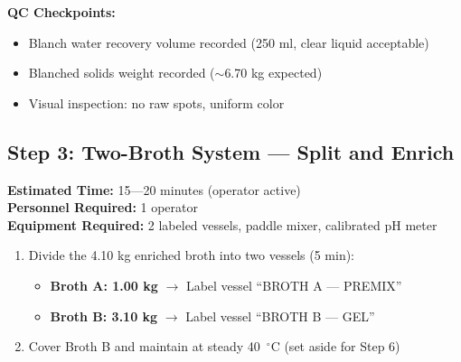 {\textbf{QC Checkpoints:}
\begin{itemize}
\item Blanch water recovery volume recorded (250 ml, clear liquid acceptable)
\item Blanched solids weight recorded ($\sim$6.70 kg expected)
\item Visual inspection: no raw spots, uniform color
\end{itemize}


\subsection*{Step 3: Two-Broth System --- Split and Enrich}
\textbf{Estimated Time:} 15---20 minutes (operator active) \\
\textbf{Personnel Required:} 1 operator \\
\textbf{Equipment Required:} 2 labeled vessels, paddle mixer, calibrated pH meter

\begin{enumerate}[leftmargin=1.5em]
\textbf{Log Start Time in Timesheet:} \_\_\_\_\_
\textbf Ensure less than 5 minutes between End Time in Step 1 and Start Time in Step 3. 
\item Divide the 4.10 kg enriched broth into two vessels (5 min):
  \begin{itemize}
  \item \textbf{Broth A: 1.00 kg} $\rightarrow$ Label vessel ``BROTH A --- PREMIX''
  \item \textbf{Broth B: 3.10 kg} $\rightarrow$ Label vessel ``BROTH B --- GEL''
  \end{itemize}
\item Cover Broth B and maintain at steady 40~$^\circ$C (set aside for Step 6)
\end{enumerate}

}
